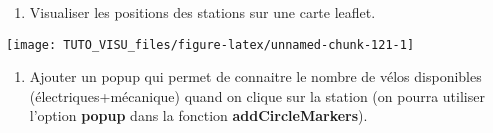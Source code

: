 \documentclass[]{article}
\newenvironment{Shaded}{\begin{snugshade}}{\end{snugshade}}
\newcommand{\DataTypeTok}[1]{\textcolor[rgb]{0.13,0.29,0.53}{#1}}
\newcommand{\DecValTok}[1]{\textcolor[rgb]{0.00,0.00,0.81}{#1}}
\newcommand{\ErrorTok}[1]{\textcolor[rgb]{0.64,0.00,0.00}{\textbf{#1}}}
\newcommand{\FloatTok}[1]{\textcolor[rgb]{0.00,0.00,0.81}{#1}}
\newcommand{\KeywordTok}[1]{\textcolor[rgb]{0.13,0.29,0.53}{\textbf{#1}}}
\newcommand{\NormalTok}[1]{#1}
\newcommand{\OperatorTok}[1]{\textcolor[rgb]{0.81,0.36,0.00}{\textbf{#1}}}
\newcommand{\OtherTok}[1]{\textcolor[rgb]{0.56,0.35,0.01}{#1}}
\newcommand{\StringTok}[1]{\textcolor[rgb]{0.31,0.60,0.02}{#1}}
\providecommand{\tightlist}{%
  \setlength{\itemsep}{0pt}\setlength{\parskip}{0pt}}
\theoremstyle{definition}
\theoremstyle{definition}
\theoremstyle{definition}
\theoremstyle{remark}
\begin{document}
\begin{Shaded}
\end{Shaded}

\begin{enumerate}
\def\labelenumi{\arabic{enumi}.}
\setcounter{enumi}{3}
\tightlist
\item
  Visualiser les positions des stations sur une carte leaflet.
\end{enumerate}

\begin{Shaded}
\end{Shaded}

\begin{center}\texttt{[image: TUTO\_VISU\_files/figure-latex/unnamed-chunk-121-1]} \end{center}

\begin{enumerate}
\def\labelenumi{\arabic{enumi}.}
\setcounter{enumi}{4}
\tightlist
\item
  Ajouter un popup qui permet de connaitre le nombre de vélos disponibles (électriques+mécanique) quand on clique sur la station (on pourra utiliser l'option \textbf{popup} dans la fonction \textbf{addCircleMarkers}).
\end{enumerate}
\end{document}
